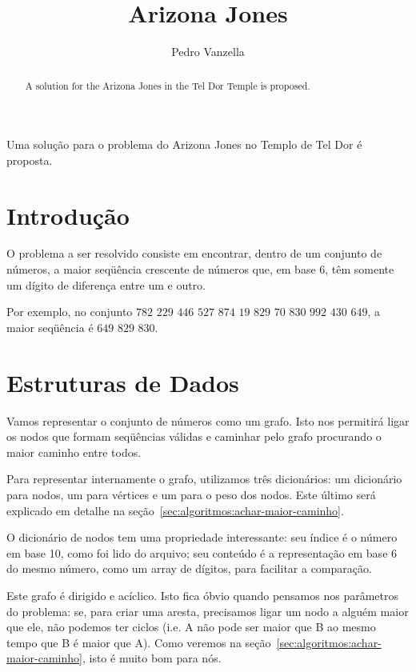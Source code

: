 \documentclass[12pt]{article}
\title{Arizona Jones}
\author{Pedro Vanzella\inst{1}}
\begin{document}
\maketitle
\begin{abstract}
  A solution for the Arizona Jones in the Tel Dor Temple is proposed.
\end{abstract}
\begin{resumo}
  Uma solu\c{c}ão para o problema do Arizona Jones no Templo de Tel Dor é proposta.
\end{resumo}


\section{Introdução}\label{sec:intro}

O problema a ser resolvido consiste em encontrar, dentro de um conjunto de números, a maior seqüência crescente de números que, em base 6, têm somente um dígito de diferen\c{c}a entre um e outro.

Por exemplo, no conjunto $782$ $229$ $446$ $527$ $874$ $19$ $829$ $70$ $830$ $992$ $430$ $649$, a maior seqüência é $649$ $829$ $830$.

\section{Estruturas de Dados}\label{sec:estruturas}
Vamos representar o conjunto de números como um grafo. Isto nos permitirá ligar os nodos que formam seqüências válidas e caminhar pelo grafo procurando o maior caminho entre todos.

Para representar internamente o grafo, utilizamos três dicionários: um dicionário para nodos, um para vértices e um para o peso dos nodos. Este último será explicado em detalhe na se\c{c}ão~\ref{sec:algoritmos:achar-maior-caminho}.

O dicionário de nodos tem uma propriedade interessante: seu índice é o número em base 10, como foi lido do arquivo; seu conteúdo é a representa\c{c}ão em base 6 do mesmo número, como um array de dígitos, para facilitar a compara\c{c}ão.

Este grafo é dirigido e acíclico. Isto fica óbvio quando pensamos nos parâmetros do problema: se, para criar uma aresta, precisamos ligar um nodo a alguém maior que ele, não podemos ter ciclos (i.e. A não pode ser maior que B ao mesmo tempo que B é maior que A). Como veremos na se\c{c}ão~\ref{sec:algoritmos:achar-maior-caminho}, isto é muito bom para nós.
\end{document}
